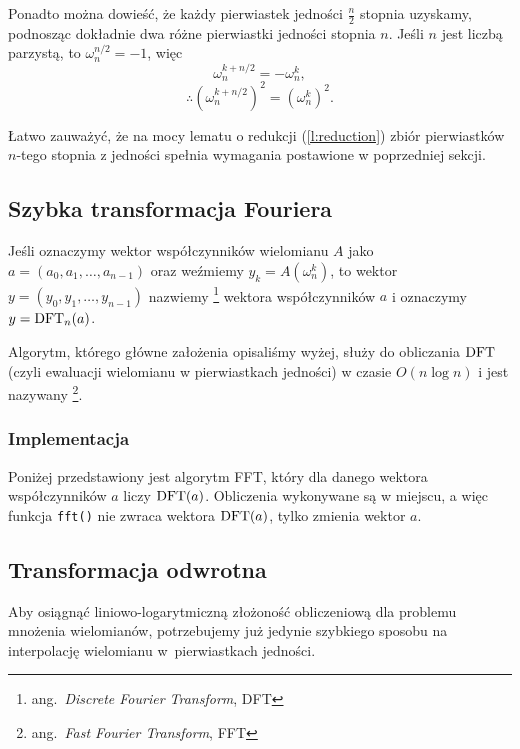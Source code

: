 \documentclass[11pt]{scrartcl}
\begin{document}
    Ponadto można dowieść, że każdy pierwiastek jedności $\frac{n}{2}$ stopnia uzyskamy, podnosząc dokładnie dwa różne pierwiastki jedności stopnia $n$. Jeśli $n$ jest liczbą parzystą, to $\omega_n^{n/2} = -1$, więc
    $$ \omega_n^{k+n/2} = -\omega_n^k, $$
    $$ \therefore (\omega_n^{k+n/2})^2 = (\omega_n^k)^2. $$

    Łatwo zauważyć, że na mocy lematu o redukcji (\ref{l:reduction}) zbiór pierwiastków $n$-tego stopnia z jedności spełnia wymagania postawione w poprzedniej sekcji.

    \subsection{Szybka transformacja Fouriera}
    Jeśli oznaczymy wektor współczynników wielomianu $A$ jako $a = (a_0, a_1, \ldots, a_{n-1})$ oraz weźmiemy $y_k = A(\omega_n^k)$, to wektor $y = (y_0, y_1, \ldots, y_{n-1})$ nazwiemy \footnote{ang.\ \textit{Discrete Fourier Transform}, DFT} wektora współczynników $a$ i oznaczymy $y = \operatorname{DFT}_n(a)$.

    Algorytm, którego główne założenia opisaliśmy wyżej, służy do obliczania $\operatorname{DFT}$ (czyli ewaluacji wielomianu w pierwiastkach jedności) w czasie $O(n\log n)$ i jest nazywany \footnote{ang.\ \textit{Fast Fourier Transform}, FFT}.

    \subsubsection{Implementacja}
    Poniżej przedstawiony jest algorytm FFT, który dla danego wektora współczynników $a$ liczy $\operatorname{DFT}(a)$. Obliczenia wykonywane są w miejscu, a więc funkcja \lstinline{fft()} nie zwraca wektora $\operatorname{DFT}(a)$, tylko zmienia wektor $a$.
    

    \subsection{Transformacja odwrotna}
    Aby osiągnąć liniowo-logarytmiczną złożoność obliczeniową dla problemu mnożenia wielomianów, potrzebujemy już jedynie szybkiego sposobu na interpolację wielomianu w~pierwiastkach jedności.
\end{document}
